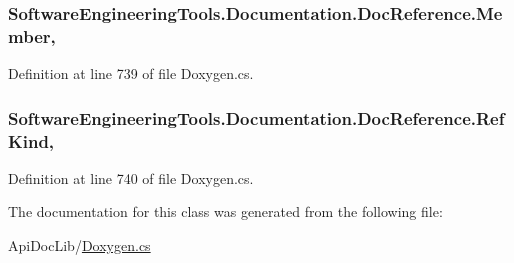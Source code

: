 \hypertarget{class_software_engineering_tools_1_1_documentation_1_1_doc_reference_a87ba528136728274b6ace3fac8f4ac5f}{
\subsubsection[{Member}]{ Software\+Engineering\+Tools.\+Documentation.\+Doc\+Reference.\+Member\hspace{0.3cm}{\ttfamily [get]}, {\ttfamily [set]}}}\label{class_software_engineering_tools_1_1_documentation_1_1_doc_reference_a87ba528136728274b6ace3fac8f4ac5f}


Definition at line 739 of file Doxygen.\+cs.

\hypertarget{class_software_engineering_tools_1_1_documentation_1_1_doc_reference_afe29145068a009c2e58f661f69038169}{
\subsubsection[{Ref\+Kind}]{ Software\+Engineering\+Tools.\+Documentation.\+Doc\+Reference.\+Ref\+Kind\hspace{0.3cm}{\ttfamily [get]}, {\ttfamily [set]}}}\label{class_software_engineering_tools_1_1_documentation_1_1_doc_reference_afe29145068a009c2e58f661f69038169}


Definition at line 740 of file Doxygen.\+cs.



The documentation for this class was generated from the following file\+:\begin{DoxyCompactItemize}
\item 
Api\+Doc\+Lib/\hyperlink{_doxygen_8cs}{Doxygen.\+cs}\end{DoxyCompactItemize}
